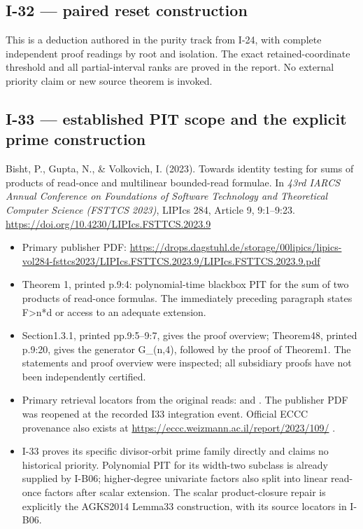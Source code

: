 \documentclass[11pt,a4paper]{article}
\providecommand{\tightlist}{\setlength{\itemsep}{0pt}\setlength{\parskip}{0pt}}
\theoremstyle{definition}\newtheorem{definition}{Definition}
\begin{document}
\subsection{I-32 --- paired reset
construction}\label{i-32--paired-reset-construction}

This is a deduction authored in the purity track from I-24, with
complete independent proof readings by root and isolation. The exact
retained-coordinate threshold and all partial-interval ranks are proved
in the report. No external priority claim or new source theorem is
invoked.

\subsection{I-33 --- established PIT scope and the explicit prime
construction}\label{i-33--established-pit-scope-and-the-explicit-prime-construction}

Bisht, P., Gupta, N., \& Volkovich, I. (2023). Towards identity testing
for sums of products of read-once and multilinear bounded-read formulae.
In \emph{43rd IARCS Annual Conference on Foundations of Software
Technology and Theoretical Computer Science (FSTTCS 2023)}, LIPIcs 284,
Article 9, 9:1--9:23. \url{https://doi.org/10.4230/LIPIcs.FSTTCS.2023.9}

\begin{itemize}
\tightlist
\item
  Primary publisher PDF:
  \url{https://drops.dagstuhl.de/storage/00lipics/lipics-vol284-fsttcs2023/LIPIcs.FSTTCS.2023.9/LIPIcs.FSTTCS.2023.9.pdf}
\item
  Theorem 1, printed p.9:4: polynomial-time blackbox PIT for the sum of
  two products of read-once formulas. The immediately preceding
  paragraph states \textbar F\textbar\textgreater n*d or access to an
  adequate extension.
\item
  Section1.3.1, printed pp.9:5--9:7, gives the proof overview;
  Theorem48, printed p.9:20, gives the generator G\_(n,4), followed by
  the proof of Theorem1. The statements and proof overview were
  inspected; all subsidiary proofs have not been independently
  certified.
\item
  Primary retrieval locators from the original reads: and . The
  publisher PDF was reopened at the recorded I33 integration event.
  Official ECCC provenance also exists at
  \url{https://eccc.weizmann.ac.il/report/2023/109/} .
\item
  I-33 proves its specific divisor-orbit prime family directly and
  claims no historical priority. Polynomial PIT for its width-two
  subclass is already supplied by I-B06; higher-degree univariate
  factors also split into linear read-once factors after scalar
  extension. The scalar product-closure repair is explicitly the
  AGKS2014 Lemma33 construction, with its source locators in I-B06.
\end{itemize}
\end{document}
